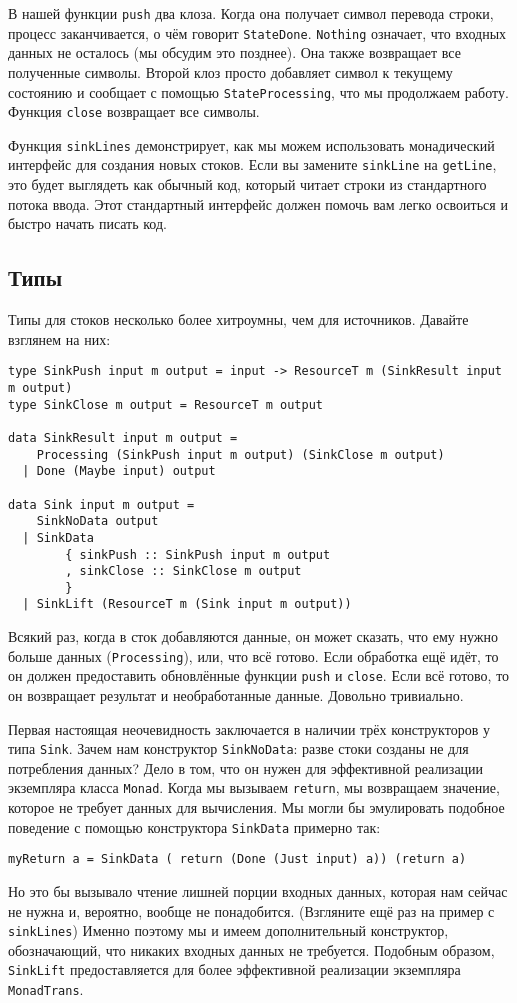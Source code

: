 В нашей функции \lstinline=push= два клоза. Когда она получает символ перевода строки,
процесс заканчивается, о чём говорит \lstinline=StateDone=. \lstinline=Nothing= означает,
что
входных данных не
осталось (мы обсудим это позднее). Она также возвращает все полученные символы. Второй
клоз просто добавляет символ к текущему состоянию и сообщает с помощью
\lstinline=StateProcessing=, что мы продолжаем работу.
Функция \lstinline=close= возвращает все символы.

Функция \lstinline=sinkLines= демонстрирует, как мы можем использовать монадический
интерфейс для создания новых стоков. Если вы замените \lstinline=sinkLine= на
\lstinline=getLine=, это будет выглядеть
как обычный код, который читает строки из стандартного потока ввода. Этот
стандартный интерфейс должен помочь вам легко освоиться и быстро начать писать код.

\subsection{Типы}

Типы для стоков несколько более хитроумны, чем для источников. Давайте взглянем на них:
\begin{lstlisting}
type SinkPush input m output = input -> ResourceT m (SinkResult input m output)
type SinkClose m output = ResourceT m output

data SinkResult input m output =
    Processing (SinkPush input m output) (SinkClose m output)
  | Done (Maybe input) output

data Sink input m output =
    SinkNoData output
  | SinkData
        { sinkPush :: SinkPush input m output
        , sinkClose :: SinkClose m output
        }
  | SinkLift (ResourceT m (Sink input m output))
\end{lstlisting}
Всякий раз, когда в сток добавляются данные, он может сказать, что ему нужно больше
данных (\lstinline{Processing}), или, что всё готово. Если обработка ещё идёт, то он должен предоставить
обновлённые функции \lstinline{push} и \lstinline{close}. Если всё готово, то он возвращает результат и
необработанные данные. Довольно тривиально.

Первая настоящая неочевидность заключается в наличии трёх конструкторов у
типа \lstinline=Sink=. Зачем нам конструктор \lstinline=SinkNoData=: разве стоки
созданы не для потребления данных? Дело в том, что он нужен для эффективной реализации
экземпляра класса \lstinline=Monad=. Когда мы вызываем \lstinline=return=, мы
возвращаем значение, которое не требует данных для вычисления. Мы могли бы эмулировать
подобное поведение с помощью конструктора \lstinline=SinkData= примерно так:
\begin{lstlisting}
myReturn a = SinkData ( return (Done (Just input) a)) (return a)
\end{lstlisting}
Но это бы вызывало чтение лишней порции входных данных, которая нам сейчас не нужна и,
вероятно, вообще не понадобится. (Взгляните ещё раз на пример с \lstinline=sinkLines=)
Именно поэтому мы и имеем дополнительный конструктор, обозначающий, что никаких входных данных не требуется.
Подобным образом, \lstinline=SinkLift= предоставляется для более эффективной реализации
экземпляра \lstinline=MonadTrans=.

